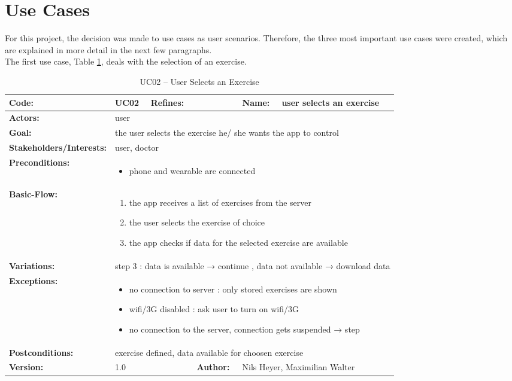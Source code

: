 \section{Use Cases}
For this project, the decision was made to use cases as user scenarios. Therefore, the three most important use cases were created, which are explained in more detail in the next few paragraphs.
\\[10pt]
The first use case, Table \ref{usae}, deals with the selection of an exercise.
\begin{table}[H]
	\begin{tabular}{|l|l|l|l|l|l|} \hline
		\textbf{Code:} & UC02 & \textbf{Refines:} &  & \textbf{Name:} & user selects an exercise \\ \hline
		\textbf{Actors:} & \multicolumn{5}{l|}{user} \\ \hline
		\textbf{Goal:} & \multicolumn{5}{l|}{the user selects the exercise he/ she wants the app to control} \\ \hline
		\textbf{Stakeholders/Interests:} & \multicolumn{5}{l|}{user, doctor} \\ \hline
		\textbf{Preconditions:} & \multicolumn{5}{l|}{\parbox{0.75\textwidth}{
			\begin{itemize}[itemsep=-5]
				\item phone and wearable are connected
			\end{itemize}
		}} \\ \hline
		\textbf{Basic-Flow:} & \multicolumn{5}{l|}{\parbox{0.75\textwidth}{
			\begin{enumerate}[itemsep=-5]
				\item the app receives a list of exercises from the server
				\item the user selects the exercise of choice
				\item the app checks if data for the selected exercise are available
			\end{enumerate}
		}} \\ \hline
		\textbf{Variations:} & \multicolumn{5}{l|}{
			step 3 : data is available → continue , data not available → download data
		} \\ \hline
		\textbf{Exceptions:} & \multicolumn{5}{l|}{\parbox{0.75\textwidth}{
			\begin{itemize}[leftmargin=1.55cm,itemsep=-5]
				\item[step 1] no connection to server :  only stored exercises are shown
				\item[step 1] wifi/3G disabled  : ask user to turn on wifi/3G
				\item[step 3] no connection to the server, connection gets suspended → step
			\end{itemize}
		}} \\ \hline
		\textbf{Postconditions:} & \multicolumn{5}{l|}{exercise defined, data available for choosen exercise} \\ \hline
		\textbf{Version:} & \multicolumn{2}{l|}{1.0} & \textbf{Author:} & \multicolumn{2}{l|}{Nils Heyer, Maximilian Walter} \\ \hline
	\end{tabular}
	\caption{UC02 -- User Selects an Exercise}
	\label{usae}
\end{table}

